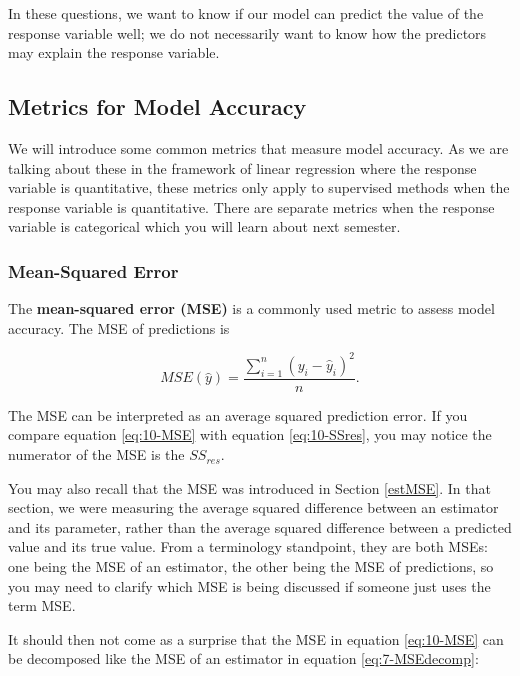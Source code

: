 \documentclass[
]{book}
\begin{document}
In these questions, we want to know if our model can predict the value of the response variable well; we do not necessarily want to know how the predictors may explain the response variable.

\hypertarget{metrics-for-model-accuracy}{%
\subsection{Metrics for Model Accuracy}\label{metrics-for-model-accuracy}}

We will introduce some common metrics that measure model accuracy. As we are talking about these in the framework of linear regression where the response variable is quantitative, these metrics only apply to supervised methods when the response variable is quantitative. There are separate metrics when the response variable is categorical which you will learn about next semester.

\hypertarget{mean-squared-error}{%
\subsubsection{Mean-Squared Error}\label{mean-squared-error}}

The \textbf{mean-squared error (MSE)} is a commonly used metric to assess model accuracy. The MSE of predictions is

\begin{equation} 
MSE(\hat{y}) = \frac{\sum_{i=1}^n (y_i - \hat{y}_i)^2}{n}.
\label{eq:10-MSE}
\end{equation}

The MSE can be interpreted as an average squared prediction error. If you compare equation \eqref{eq:10-MSE} with equation \eqref{eq:10-SSres}, you may notice the numerator of the MSE is the \(SS_{res}\).

You may also recall that the MSE was introduced in Section \ref{estMSE}. In that section, we were measuring the average squared difference between an estimator and its parameter, rather than the average squared difference between a predicted value and its true value. From a terminology standpoint, they are both MSEs: one being the MSE of an estimator, the other being the MSE of predictions, so you may need to clarify which MSE is being discussed if someone just uses the term MSE.

It should then not come as a surprise that the MSE in equation \eqref{eq:10-MSE} can be decomposed like the MSE of an estimator in equation \eqref{eq:7-MSEdecomp}:
\end{document}
